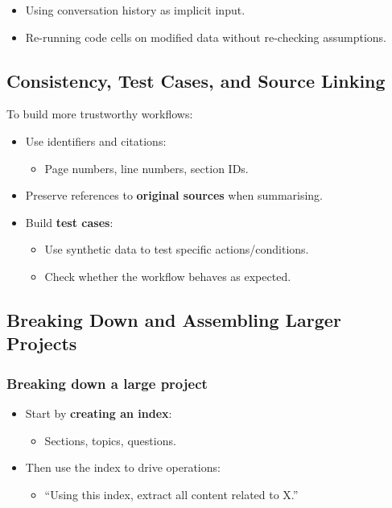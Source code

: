 \documentclass[
  letterpaper,
  DIV=11,
  numbers=noendperiod]{scrreprt}
\providecommand{\tightlist}{%
  \setlength{\itemsep}{0pt}\setlength{\parskip}{0pt}}
\begin{document}
\begin{itemize}
\tightlist
\item
  Using conversation history as implicit input.
\item
  Re-running code cells on modified data without re-checking
  assumptions.
\end{itemize}

\subsection{Consistency, Test Cases, and Source
Linking}\label{consistency-test-cases-and-source-linking}

To build more trustworthy workflows:

\begin{itemize}
\tightlist
\item
  Use identifiers and citations:

  \begin{itemize}
  \tightlist
  \item
    Page numbers, line numbers, section IDs.
  \end{itemize}
\item
  Preserve references to \textbf{original sources} when summarising.
\item
  Build \textbf{test cases}:

  \begin{itemize}
  \tightlist
  \item
    Use synthetic data to test specific actions/conditions.
  \item
    Check whether the workflow behaves as expected.
  \end{itemize}
\end{itemize}

\subsection{Breaking Down and Assembling Larger
Projects}\label{breaking-down-and-assembling-larger-projects}

\subsubsection{Breaking down a large
project}\label{breaking-down-a-large-project}

\begin{itemize}
\tightlist
\item
  Start by \textbf{creating an index}:

  \begin{itemize}
  \tightlist
  \item
    Sections, topics, questions.
  \end{itemize}
\item
  Then use the index to drive operations:

  \begin{itemize}
  \tightlist
  \item
    ``Using this index, extract all content related to X.''
  \end{itemize}
\end{itemize}
\end{document}
